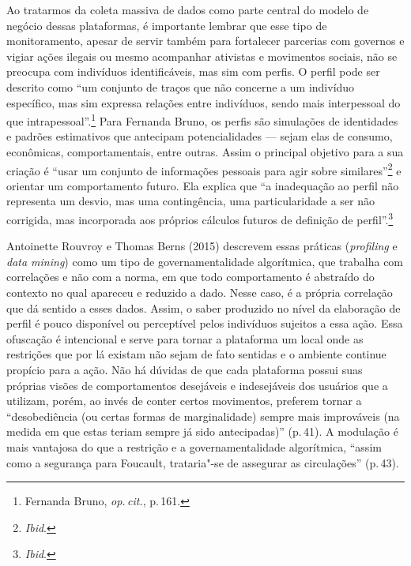 Ao tratarmos da coleta massiva de dados como parte central do modelo de
negócio dessas plataformas, é importante lembrar que esse tipo de
monitoramento, apesar de servir também para fortalecer parcerias com
governos e vigiar ações ilegais ou mesmo acompanhar ativistas e
movimentos sociais, não se preocupa com indivíduos identificáveis, mas
sim com perfis. O perfil pode ser descrito como ``um conjunto de traços
que não concerne a um indivíduo específico, mas sim expressa relações
entre indivíduos, sendo mais interpessoal do que intrapessoal''.\footnote{Fernanda Bruno, \textit{op.\,cit.}, p.\,161.} Para Fernanda Bruno, os perfis são simulações de identidades e
padrões estimativos que antecipam potencialidades ­--- sejam elas de
consumo, econômicas, comportamentais, entre outras. Assim o principal
objetivo para a sua criação é ``usar um conjunto de informações pessoais
para agir sobre similares''\footnote{\textit{Ibid}.} e orientar um comportamento futuro.
Ela explica que ``a inadequação ao perfil não representa um desvio, mas
uma contingência, uma particularidade a ser não corrigida, mas
incorporada aos próprios cálculos futuros de definição de
perfil''.\footnote{\textit{Ibid}.}

Antoinette Rouvroy e Thomas Berns (2015) descrevem essas práticas
(\emph{profiling} e \emph{data mining}) como um tipo de
governamentalidade algorítmica, que trabalha com correlações e não com a
norma, em que todo comportamento é abstraído do contexto no qual
apareceu e reduzido a dado. Nesse caso, é a própria correlação que dá
sentido a esses dados. Assim, o saber produzido no nível da elaboração
de perfil é pouco disponível ou perceptível pelos indivíduos sujeitos a
essa ação. Essa ofuscação é intencional e serve para tornar a plataforma
um local onde as restrições que por lá existam não sejam de fato
sentidas e o ambiente continue propício para a ação. Não há dúvidas de
que cada plataforma possui suas próprias visões de comportamentos
desejáveis e indesejáveis dos usuários que a utilizam, porém, ao invés
de conter certos movimentos, preferem tornar a ``desobediência (ou
certas formas de marginalidade) sempre mais improváveis (na medida em
que estas teriam sempre já sido antecipadas)'' (p.\,41). A modulação é mais
vantajosa do que a restrição e a governamentalidade algorítmica, ``assim
como a segurança para Foucault, trataria"-se de assegurar as
circulações'' (p.\,43).

